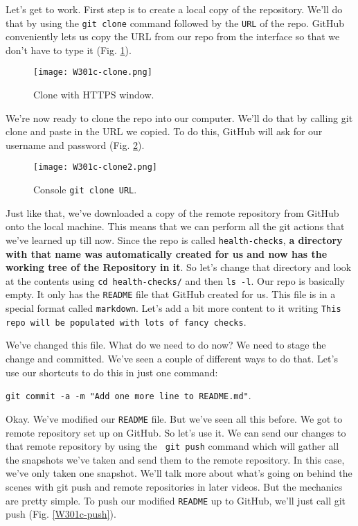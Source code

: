 	Let's get to work. First step is to create a local copy of the repository. 
	We'll do that by using the \texttt{git clone} command followed by the \texttt{URL} of the repo. 
	GitHub conveniently lets us copy the URL from our repo from the interface so that we don't have to type it (Fig. \ref{W301c-clone}).
	
	\begin{figure} 
		\caption{Clone with HTTPS window.}
		\centering
		\texttt{[image: W301c-clone.png]}
		\label{W301c-clone}
	\end{figure}
	
	We're now ready to clone the repo into our computer. We'll do that by calling git clone and paste in the URL we copied. To do this, GitHub will ask for our username and password (Fig. \ref{W301c-clone2}).
	
	\begin{figure} 
		\caption{Console \texttt{git clone URL}.}
		\centering
		\texttt{[image: W301c-clone2.png]}
		\label{W301c-clone2}
	\end{figure}
	
	Just like that, we've downloaded a copy of the remote repository from GitHub onto the local machine. This means that we can perform all the git actions that we've learned up till now. Since the repo is called \verb|health-checks|, \textbf{a directory with that name was automatically created for us and now has the working tree of the Repository in it}. So let's change that directory and look at the contents using \verb|cd health-checks/| and then \verb|ls -l|. Our repo is basically empty. It only has the \verb|README| file that GitHub created for us. This file is in a special format called \texttt{markdown}. Let's add a bit more content to it writing \texttt{This repo will be populated with lots of fancy checks}. 
	
	We've changed this file. What do we need to do now? We need to stage the change and committed. We've seen a couple of different ways to do that. Let's use our shortcuts to do this in just one command:
	
	\verb|git commit -a -m "Add one more line to README.md"|. 
	
	Okay. We've modified our \verb|README| file. But we've seen all this before. We got to remote repository set up on GitHub. So let's use it. We can send our changes to that remote repository by using the \verb| git push| command which will gather all the snapshots we've taken and send them to the remote repository. In this case, we've only taken one snapshot. We'll talk more about what's going on behind the scenes with git push and remote repositories in later videos. But the mechanics are pretty simple. To push our modified \verb|README| up to GitHub, we'll just call git push (Fig. \ref{W301c-push}).
	
